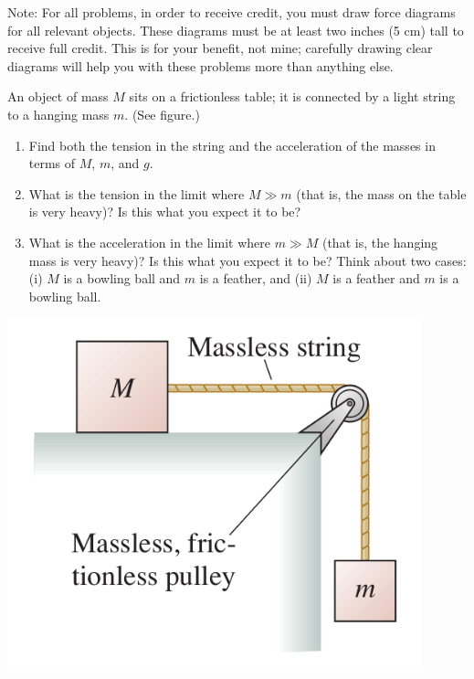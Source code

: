 \documentclass[12pt]{article}
\begin{document}
\Large
\centerline{}
\normalsize
\centerline{}

{\sc Note:} For all problems, in order to receive credit, you must draw force diagrams for all relevant objects. These diagrams must be at least two inches (5 cm) tall to receive full credit.
This is for your benefit, not mine; carefully drawing clear diagrams will help you with these problems more than anything else.

\vspace{1em}

\begin{enumerate}


  \begin{minipage}{0.7\textwidth}
\item  An object of mass $M$ sits on a frictionless table; it is connected by
   a light string to a hanging mass $m$. (See figure.)
\begin{enumerate}
\item Find both the tension in the string and the acceleration of the masses in terms of $M$, $m$, and $g$.
\item What is the tension in the limit where $M \gg m$ (that is, the mass on the table is very heavy)? Is this what you expect it to be?
\item What is the acceleration in the limit where $m \gg M$ (that is, the hanging mass is very heavy)? Is this what you expect it to be? Think about two cases: (i) $M$ is a bowling ball and $m$ is a feather, and (ii) $M$ is a feather and $m$ is a bowling ball.
\end{enumerate}
  \end{minipage}
  \begin{minipage}{0.3\textwidth}
\centerline{\includegraphics[width=0.9\textwidth]{problem736.png}}
  \end{minipage}


\end{enumerate}
\end{document}
